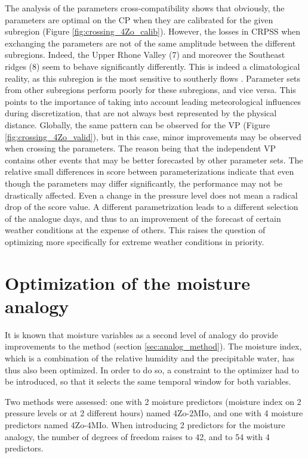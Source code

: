 \documentclass[5p]{elsarticle}
\begin{document}
The analysis of the parameters cross-compatibility shows that obviously, the parameters are optimal on the CP when they are calibrated for the given subregion (Figure \ref{fig:crossing_4Zo_calib}). However, the losses in CRPSS when exchanging the parameters are not of the same amplitude between the different subregions. Indeed, the Upper Rhone Valley (7) and moreover the Southeast ridges (8) seem to behave significantly differently. This is indeed a climatological reality, as this subregion is the most sensitive to southerly flows \citep{Horton2012}. Parameter sets from other subregions perform poorly for these subregions, and vice versa. This points to the importance of taking into account leading meteorological influences during discretization, that are not always best represented by the physical distance. Globally, the same pattern can be observed for the VP (Figure \ref{fig:crossing_4Zo_valid}), but in this case, minor improvements may be observed when crossing the parameters. The reason being that the independent VP contains other events that may be better forecasted by other parameter sets. The relative small differences in score between parameterizations indicate that even though the parameters may differ significantly, the performance may not be drastically affected. Even a change in the pressure level does not mean a radical drop of the score value. A different parametrization leads to a different selection of the analogue days, and thus to an improvement of the forecast of certain weather conditions at the expense of others. This raises the question of optimizing more specifically for extreme weather conditions in priority. 


\section{Optimization of the moisture analogy}
\label{sec:optim_moisture}

It is known that moisture variables as a second level of analogy do provide improvements to the method (section \ref{sec:analog_method}). The moisture index, which is a combination of the relative humidity and the precipitable water, has thus also been optimized. In order to do so, a constraint to the optimizer had to be introduced, so that it selects the same temporal window for both variables. 

Two methods were assessed: one with 2 moisture predictors (moisture index on 2 pressure levels or at 2 different hours) named 4Zo-2MIo, and one with 4 moisture predictors named 4Zo-4MIo. When introducing 2 predictors for the moisture analogy, the number of degrees of freedom raises to 42, and to 54 with 4 predictors.
\end{document}
